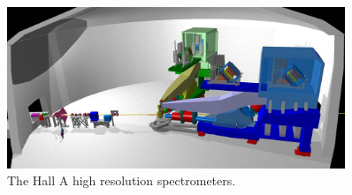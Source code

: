 \begin{figure}[tb!]
\centering
\includegraphics[width=0.9\textwidth]{figs/HRS_spectrometer.png}
\caption[Hall A HRS spectrometer]{The Hall A high resolution spectrometers.  \label{fig:HRS_spectrometer}}
\end{figure}

